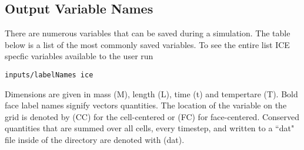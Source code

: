 \subsection{Output Variable Names}
There are numerous variables that can be saved during a simulation.  The table below is a list of the most commonly saved variables.  To see the entire list ICE specfic variables available to the user run
%
\begin{Verbatim}[fontsize=\footnotesize]
  inputs/labelNames ice
\end{Verbatim}
% 
Dimensions are given in mass (M), length (L), time (t) and tempertare (T).  Bold face label names signify vectors quantities.  The location of the variable on the grid is denoted by (CC) for the cell-centered or (FC) for face-centered.  Conserved quantities that are summed over all cells, every timestep, and written to a ``dat" file inside of the  directory are denoted with (dat).
%
\newpage
